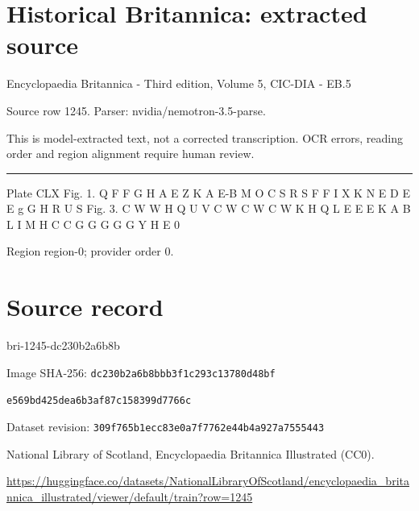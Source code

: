 \documentclass[11pt]{article}
\begin{document}
\section*{Historical Britannica: extracted source}
Encyclopaedia Britannica - Third edition, Volume 5, CIC-DIA - EB.5\par
{\small Source row 1245. Parser: nvidia/nemotron-3.5-parse.\par}
{\small This is model-extracted text, not a corrected transcription. OCR errors, reading order and region alignment require human review.\par}
\hrule\medskip
Plate CLX
Fig. 1.
Q
F
F
G
H
A
E
Z
K
A
E-B
M
O
C
S
R
S
F
F
I
X
K
N
E
D
E
E
g
G
H
R
U
S
Fig. 3.
C
W
W
H
Q
U
V
C
W
C
W
C
W
K
H
Q
L
E
E
E
K
A
B L
I
M
H
C
C
G
G
G
G
G
Y
H
E
0
\par

{\scriptsize\color{gray} Region region-0; provider order 0.\par}
\medskip
\newpage\section*{Source record}
bri-1245-dc230b2a6b8b\par
Image SHA-256: \texttt{dc230b2a6b8bbb3f1c293c13780d48bf}\par\texttt{e569bd425dea6b3af87c158399d7766c}\par
Dataset revision: \texttt{309f765b1ecc83e0a7f7}\texttt{762e44b4a927a7555443}\par
National Library of Scotland, Encyclopaedia Britannica Illustrated (CC0).\par
\url{https://huggingface.co/datasets/NationalLibraryOfScotland/encyclopaedia_britannica_illustrated/viewer/default/train?row=1245}
\end{document}
